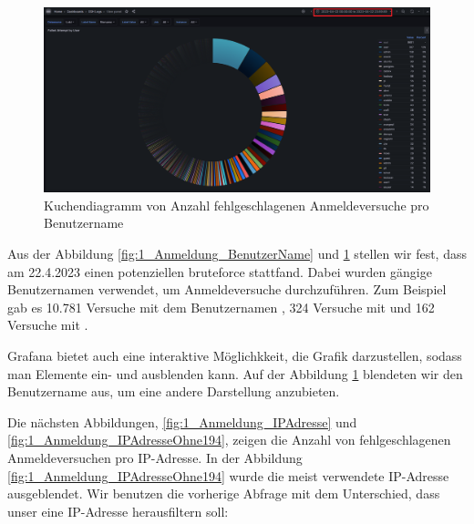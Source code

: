 \newpage
{}
\thispagestyle{lscape}
\begin{landscape}
    \begin{figure}[H]
        \centerline{\includegraphics[width=1.7\textwidth]{assets/Failed_pro_user2.png}}
        \caption[Kuchendiagramm von Anzahl fehlgeschlagenen Anmeldeversuche pro Benutzername]
        {Kuchendiagramm von Anzahl fehlgeschlagenen Anmeldeversuche pro Benutzername}
        \label{fig:1_Anmeldung_BenutzerNameOhneRoot}
        \centering
    \end{figure}
\end{landscape}
\restoregeometry

Aus der Abbildung \ref{fig:1_Anmeldung_BenutzerName} und \ref{fig:1_Anmeldung_BenutzerNameOhneRoot} stellen wir fest, dass am 22.4.2023 einen potenziellen \gls{bruteforce} stattfand. Dabei wurden gängige Benutzernamen verwendet, um Anmeldeversuche durchzuführen. Zum Beispiel gab es 10.781 Versuche mit dem Benutzernamen , 324 Versuche mit  und 162 Versuche mit . 

Grafana bietet auch eine interaktive Möglichkkeit, die Grafik darzustellen, sodass man Elemente ein- und ausblenden kann. Auf der Abbildung \ref{fig:1_Anmeldung_BenutzerNameOhneRoot} blendeten wir den Benutzername  aus, um eine andere Darstellung anzubieten.

Die nächsten Abbildungen, \ref{fig:1_Anmeldung_IPAdresse} und \ref{fig:1_Anmeldung_IPAdresseOhne194}, zeigen die Anzahl von fehlgeschlagenen Anmeldeversuchen pro IP-Adresse. In der Abbildung \ref{fig:1_Anmeldung_IPAdresseOhne194} wurde die meist verwendete IP-Adresse ausgeblendet. Wir benutzen die vorherige Abfrage mit dem Unterschied, dass unser \textcolor{blue}{} eine IP-Adresse herausfiltern soll:

